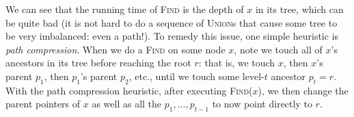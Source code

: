 \documentclass[12pt]{article}
\begin{document}
\begin{center}
\end{center}

\begin{center}
\end{center}

We can see that the running time of \textsc{Find} is the depth of $x$ in its tree, which can be quite bad (it is not hard to do a sequence of \textsc{Union}s that cause some tree to be very imbalanced: even a path!). To remedy this issue, one simple heuristic is {\em path compression}. When we do a \textsc{Find} on some node $x$, note we touch all of $x$'s ancestors in its tree before reaching the root $r$: that is, we touch $x$, then $x$'s parent $p_1$, then $p_1$'s parent $p_2$, etc., until we touch some level-$t$ ancestor $p_t = r$. With the path compression heuristic, after executing \textsc{Find}($x$), we then change the parent pointers of $x$ as well as all the $p_1,\ldots,p_{t-1}$ to now point directly to $r$.
\end{document}
